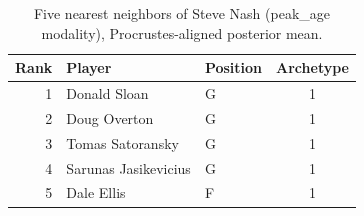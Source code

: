 \begin{table}[htbp]
  \centering\small
  \begin{tabular}{rllc}
    \toprule
    Rank & Player & Position & Archetype \\
    \midrule
    1 & Donald Sloan & G & 1 \\
    2 & Doug Overton & G & 1 \\
    3 & Tomas Satoransky & G & 1 \\
    4 & Sarunas Jasikevicius & G & 1 \\
    5 & Dale Ellis & F & 1 \\
    \bottomrule
  \end{tabular}
  \caption{Five nearest neighbors of Steve Nash (peak_age modality), Procrustes-aligned posterior mean.}
  \label{tab:Steve_Nash_neighbors_peak_age}
\end{table}

